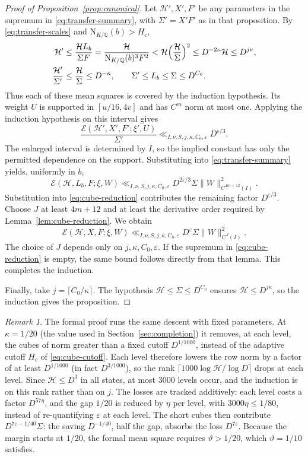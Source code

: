 \documentclass[11pt,a4paper]{article}
\numberwithin{equation}{section}
\numberwithin{figure}{section}
\theoremstyle{definition}
\theoremstyle{remark}
\newtheorem{remark}[theorem]{Remark}
\newcommand{\Q}{\mathbb Q}
\newcommand{\NK}{\mathrm N_{K/\Q}}
\newcommand{\E}{\mathcal E}
\begin{document}
\begin{proof}[Proof of Proposition~\ref{prop:canonical}]
Let $\mathcal H',X',F'$ be any parameters in the supremum in
\eqref{eq:transfer-summary}, with $\Sigma'=X'F'$ as in that proposition.
By \eqref{eq:transfer-scales} and $\NK(b)>H_c$,
\[
 \begin{aligned}
 \mathcal H'
 &\le\frac{\mathcal H L_b}{\Sigma F}
 =\frac{\mathcal H}{\NK(b)^3F^2}
 <\mathcal H\Bigl(\frac{\mathcal H}{\Sigma}\Bigr)^2
 \le D^{-2\kappa}\mathcal H\le D^{j\kappa},\\
 \frac{\mathcal H'}{\Sigma'}
 &\le\frac{\mathcal H}{\Sigma}\le D^{-\kappa},
 \qquad \Sigma'\le L_b\le\Sigma\le D^{C_0}.
 \end{aligned}
\]
Thus each of these mean squares is covered by the induction hypothesis.
Its weight $U$ is supported in $[u/16,4v]$ and has $C^m$ norm at most one.
Applying the induction hypothesis on this interval gives
\[
 \frac{\E(\mathcal H',X',F';\xi',U)}{\Sigma'}
 \ll_{I,\nu,S,j,\kappa,C_0,\varepsilon}D^{\varepsilon/3}.
\]
The enlarged interval is determined by $I$, so the implied constant
has only the permitted dependence on the support.
Substituting into \eqref{eq:transfer-summary} yields, uniformly in $b$,
\[
 \E(\mathcal H,L_b,F;\xi,W)
 \ll_{I,\nu,S,j,\kappa,C_0,\varepsilon}
 D^{2\varepsilon/3}\Sigma\|W\|_{C^{4m+12}(I)}^2.
\]
Substitution into \eqref{eq:cube-reduction} contributes the remaining
factor $D^{\varepsilon/3}$. Choose $J$ at least $4m+12$ and at least
the derivative order required by Lemma~\ref{lem:cube-reduction}.
We obtain
\[
 \E(\mathcal H,X,F;\xi,W)
 \ll_{I,\nu,S,j,\kappa,C_0,\varepsilon}
 D^\varepsilon\Sigma\|W\|_{C^J(I)}^2.
\]
The choice of $J$ depends only on $j,\kappa,C_0,\varepsilon$.
If the supremum in \eqref{eq:cube-reduction} is empty, the same bound
follows directly from that lemma. This completes the induction.

Finally, take $j=\lceil C_0/\kappa\rceil$.
The hypothesis $\mathcal H\le\Sigma\le D^{C_0}$ ensures
$\mathcal H\le D^{j\kappa}$, so the induction gives the proposition.
\end{proof}

\begin{remark}\label{rem:formal-descent}
The formal proof runs the same descent with fixed parameters. At $\kappa=1/20$ (the value used in
Section~\ref{sec:completion}) it removes, at each level, the cubes of norm greater than a fixed
cutoff $D^{1/1000}$, instead of the adaptive cutoff $H_c$ of \eqref{eq:cube-cutoff}. Each level
therefore lowers the row norm by a factor of at least $D^{1/1000}$ (in fact $D^{3/1000}$), so the
rank $\lceil1000\log\mathcal H/\log D\rceil$ drops at each level. Since $\mathcal H\le D^3$ in all
states, at most $3000$ levels occur, and the induction is on this rank rather than on $j$. The losses
are tracked additively: each level costs a factor $D^{57\eta}$, and the gap $1/20$ is reduced
by $\eta$ per level, with $3000\eta\le1/80$, instead of re-quantifying $\varepsilon$ at each
level. The short cubes then contribute $D^{7\varepsilon-1/40}\Sigma$: the saving $D^{-1/40}$,
half the gap, absorbs the loss $D^{7\varepsilon}$. Because the margin starts at $1/20$, the
formal mean square requires $\vartheta>1/20$, which $\vartheta=1/10$ satisfies.
\end{remark}
\end{document}
